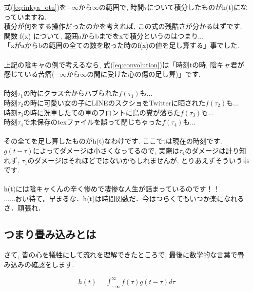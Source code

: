 \documentclass[11pt,a4paper]{jreport}
\begin{document}
式(\ref{eq:inkya_otu})を$-\infty$から$\infty$の範囲で, 時間$\tau$について積分したものがh(t)になっていますね.\\
積分が何をする操作だったのかを考えれば, この式の残酷さが分かるはずです.\\
関数 f(x) について, 範囲aからbまでをxで積分というのはつまり...\\
「xがaからbの範囲の全ての数を取った時のf(x)の値を足し算する」事でした. \\
\\
上記の陰キャの例で考えるなら, 式(\ref{eq:convolution})は「時刻tの時, 陰キャ君が感じている苦痛($-\infty$から$\infty$の間に受けた心の傷の足し算)」です.\\
\\
時刻$\tau_1$の時にクラス会からハブられた$f(\tau_1)$も...\\
時刻$\tau_2$の時に可愛い女の子にLINEのスクショをTwitterに晒された$f(\tau_2)$も...\\
時刻$\tau_3$の時に洗車したての車のフロントに鳥の糞が落ちた$f(\tau_3)$も...\\
時刻$\tau_4$で未保存のtexファイルを誤って閉じちゃった$f(\tau_4)$も...\\
\\
その全てを足し算したものがh(t)なわけです. ここでtは現在の時刻です. \\
$g(t-\tau)$によってダメージは小さくなってるので, 実際は$\tau_4$のダメージは計り知れず, $\tau_1$のダメージはそれほどではないかもしれませんが, とりあえずそういう事です. \\
\\
h(t)には陰キャくんの辛く惨めで凄惨な人生が詰まっているのです！！\\
......おい待て，早まるな．h(t)は時間関数だ．今はつらくてもいつか楽になれるさ．頑張れ．



\subsection{つまり畳み込みとは}
さて, 皆の心を犠牲にして流れを理解できたところで, 最後に数学的な言葉で畳み込みの確認をします.

\begin{eqnarray}
\label{eq:conv}
h(t) = \int^{\infty}_{-\infty} f(\tau) g(t - \tau) d\tau
\end{eqnarray}
\end{document}
